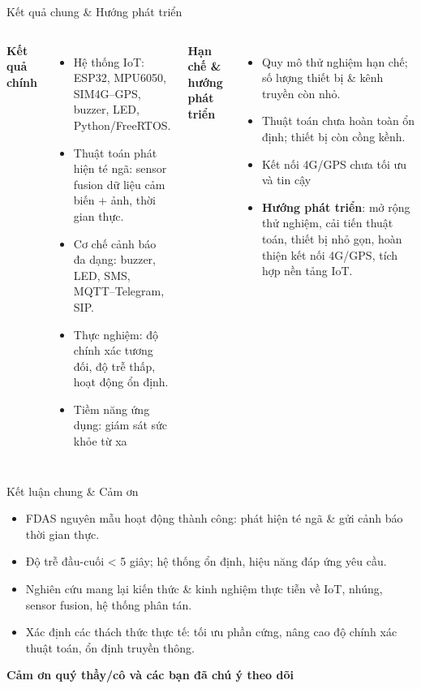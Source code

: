 
\begin{frame}{Kết quả chung \& Hướng phát triển}
\begin{columns}[T]
    \textbf{Kết quả chính}
    \begin{itemize}
        \item Hệ thống IoT: ESP32, MPU6050, SIM4G--GPS, buzzer, LED, Python/FreeRTOS.
        \item Thuật toán phát hiện té ngã: sensor fusion dữ liệu cảm biến + ảnh, thời gian thực.
        \item Cơ chế cảnh báo đa dạng: buzzer, LED, SMS, MQTT--Telegram, SIP.
        \item Thực nghiệm: độ chính xác tương đối, độ trễ thấp, hoạt động ổn định.
        \item Tiềm năng ứng dụng: giám sát sức khỏe từ xa
    \end{itemize}

    \textbf{Hạn chế \& hướng phát triển}
    \begin{itemize}
        \item Quy mô thử nghiệm hạn chế; số lượng thiết bị & kênh truyền còn nhỏ.
        \item Thuật toán chưa hoàn toàn ổn định; thiết bị còn cồng kềnh.
        \item Kết nối 4G/GPS chưa tối ưu và tin cậy
        \item \textbf{Hướng phát triển}: mở rộng thử nghiệm, cải tiến thuật toán, thiết bị nhỏ gọn, hoàn thiện kết nối 4G/GPS, tích hợp nền tảng IoT.
    \end{itemize}
\end{columns}
\end{frame}

\begin{frame}{Kết luận chung \& Cảm ơn}
\begin{itemize}
    \item FDAS nguyên mẫu hoạt động thành công: phát hiện té ngã & gửi cảnh báo thời gian thực.
    \item Độ trễ đầu-cuối < 5 giây; hệ thống ổn định, hiệu năng đáp ứng yêu cầu.
    \item Nghiên cứu mang lại kiến thức & kinh nghiệm thực tiễn về IoT, nhúng, sensor fusion, hệ thống phân tán.
    \item Xác định các thách thức thực tế: tối ưu phần cứng, nâng cao độ chính xác thuật toán, ổn định truyền thông.
\end{itemize}

\vspace{0.5cm}
\centering
\textbf{Cảm ơn quý thầy/cô và các bạn đã chú ý theo dõi}
\end{frame}
